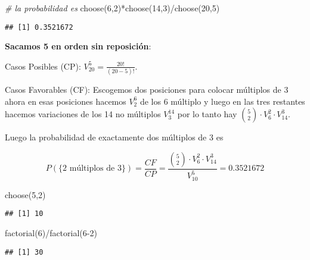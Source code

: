 \documentclass[
]{article}
\newenvironment{Shaded}{\begin{snugshade}}{\end{snugshade}}
\newcommand{\CommentTok}[1]{\textcolor[rgb]{0.56,0.35,0.01}{\textit{#1}}}
\newcommand{\DecValTok}[1]{\textcolor[rgb]{0.00,0.00,0.81}{#1}}
\newcommand{\FunctionTok}[1]{\textcolor[rgb]{0.00,0.00,0.00}{#1}}
\newcommand{\NormalTok}[1]{#1}
\newcommand{\SpecialCharTok}[1]{\textcolor[rgb]{0.00,0.00,0.00}{#1}}
\begin{document}
\begin{Shaded}
\begin{Highlighting}[]
\CommentTok{\# la probabilidad es }
\FunctionTok{choose}\NormalTok{(}\DecValTok{6}\NormalTok{,}\DecValTok{2}\NormalTok{)}\SpecialCharTok{*}\FunctionTok{choose}\NormalTok{(}\DecValTok{14}\NormalTok{,}\DecValTok{3}\NormalTok{)}\SpecialCharTok{/}\FunctionTok{choose}\NormalTok{(}\DecValTok{20}\NormalTok{,}\DecValTok{5}\NormalTok{)}
\end{Highlighting}
\end{Shaded}

\begin{verbatim}
## [1] 0.3521672
\end{verbatim}

\textbf{Sacamos 5 en orden sin reposición}:

Casos Posibles (CP): \(V_{20}^{5}=\frac{20!}{(20-5)!}.\)

Casos Favorables (CF): Escogemos dos posiciones para colocar múltiplos
de 3 ahora en esas posiciones hacemos \(V_2^6\) de los 6 múltiplo y
luego en las tres restantes hacemos variaciones de los 14 no múltiplos
\(V_3^{14}\) por lo tanto hay
\({5 \choose 2}\cdot V_6^2\cdot V_{14}^{3}\).

Luego la probabilidad de exactamente dos múltiplos de 3 es

\[
P(\mbox{\{2 múltiplos de 3\}} )=\frac{CF}{CP}=\frac{{5\choose 2}\cdot V_{6}^{2}\cdot V_{14}^{3}}{V_{10}^{5}}=
0.3521672
\]

\begin{Shaded}
\begin{Highlighting}[]
\FunctionTok{choose}\NormalTok{(}\DecValTok{5}\NormalTok{,}\DecValTok{2}\NormalTok{)}
\end{Highlighting}
\end{Shaded}

\begin{verbatim}
## [1] 10
\end{verbatim}

\begin{Shaded}
\begin{Highlighting}[]
\FunctionTok{factorial}\NormalTok{(}\DecValTok{6}\NormalTok{)}\SpecialCharTok{/}\FunctionTok{factorial}\NormalTok{(}\DecValTok{6{-}2}\NormalTok{)}
\end{Highlighting}
\end{Shaded}

\begin{verbatim}
## [1] 30
\end{verbatim}
\end{document}
